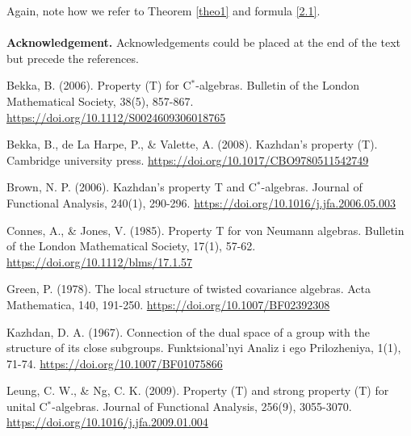 \documentclass[12pt, reqno]{amsart}
\theoremstyle{definition}
\theoremstyle{remark}
\numberwithin{equation}{section}
\begin{document}
Again, note how we refer to Theorem \ref{theo1} and formula \eqref{2.1}.
\\
\\
{\bf Acknowledgement.} Acknowledgements could be placed at the end
of the text but precede the references.



\begin{thebibliography}{99}

 Bekka, B. (2006). Property (T) for C$^*$-algebras. Bulletin of the London Mathematical Society, 38(5), 857-867.
\url{https://doi.org/10.1112/S0024609306018765}

  Bekka, B., de La Harpe, P., \& Valette, A. (2008). Kazhdan's property (T). Cambridge university press.
\url{https://doi.org/10.1017/CBO9780511542749}

 Brown, N. P. (2006). Kazhdan's property T and C$^*$-algebras. Journal of Functional Analysis, 240(1), 290-296.
\url{https://doi.org/10.1016/j.jfa.2006.05.003}


  Connes, A., \& Jones, V. (1985). Property T for von Neumann algebras. Bulletin of the London Mathematical Society, 17(1), 57-62.
\url{https://doi.org/10.1112/blms/17.1.57}

  Green, P. (1978). The local structure of twisted covariance algebras. Acta Mathematica, 140, 191-250.
\url{https://doi.org/10.1007/BF02392308}
    
 Kazhdan, D. A. (1967). Connection of the dual space of a group with the structure of its close subgroups. Funktsional'nyi Analiz i ego Prilozheniya, 1(1), 71-74.
\url{https://doi.org/10.1007/BF01075866}

 Leung, C. W., \& Ng, C. K. (2009). Property (T) and strong property (T) for unital C$^*$-algebras. Journal of Functional Analysis, 256(9), 3055-3070.
\url{https://doi.org/10.1016/j.jfa.2009.01.004}

\end{thebibliography}
\end{document}

